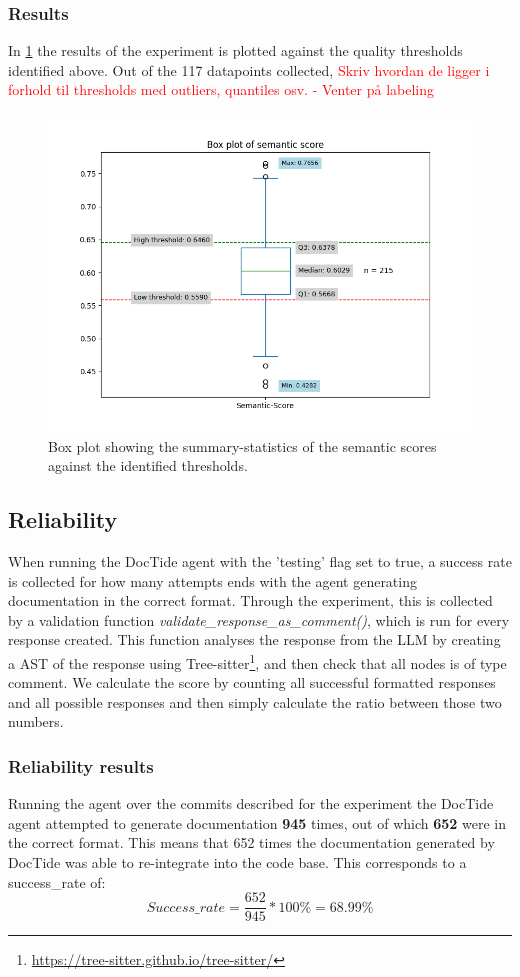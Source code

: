 \subsubsection{Results}
In \cref{fig:sem_box} the results of the experiment is plotted against the quality thresholds identified above. Out of the 117 datapoints collected, \textcolor{red}{Skriv hvordan de ligger i forhold til thresholds med outliers, quantiles osv. - Venter på labeling}

\label{sec:sem_results}
\begin{figure}[H]
\centering
\includegraphics[width=0.7\linewidth]{Figures/semantic_score_box_plot.png}
\caption{Box plot showing the summary-statistics of the semantic scores against the identified thresholds.}
\label{fig:sem_box}
\end{figure}

\subsection{Reliability}
When running the DocTide agent with the 'testing' flag set to true, a success rate is collected for how many attempts ends with the agent generating documentation in the correct format.
Through the experiment, this is collected by a validation function \textit{validate\_response\_as\_comment()}, which is run for every response created. This function analyses the response from the LLM by creating a AST of the response using Tree-sitter\footnote{\url{https://tree-sitter.github.io/tree-sitter/}}, and then check that all nodes is of type comment.
We calculate the score by counting all successful formatted responses and all possible responses and then simply calculate the ratio between those two numbers.
\subsubsection{Reliability results}
\label{sec:suc_results}
Running the agent over the commits described for the experiment the DocTide agent attempted to generate documentation \textbf{945} times, out of which \textbf{652} were in the correct format. This means that 652 times the documentation generated by DocTide was able to re-integrate into the code base. This corresponds to a success\_rate of:
\[
Success\_rate=\frac{652}{945}*100\% = 68.99\%
\]

